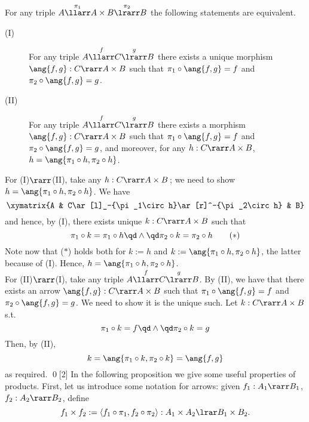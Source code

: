 \documentclass[12pt]{article}
\begin{document}
\begin{myproposition}\label{p:prod}
For any triple $A\overset{\pi_1}{\llarr}A\times B\overset{\pi_2}{\lrarr}B$ the following statements are equivalent.
\begin{description}
\item[(I)] For any triple $A\overset{f}{\llarr}C\overset{g}{\lrarr}B$ there exists a {unique} morphism $\ang{f,g}:C\rarr A\times B$
                        such that $\pi_1\circ\ang{f,g}=f$ and $\pi_2\circ\ang{f,g}=g$.
\item[(II)]For any triple $A\overset{f}{\llarr}C\overset{g}{\lrarr}B$ there exists a morphism $\ang{f,g}:C\rarr A\times B$
                        such that $\pi_1\circ\ang{f,g}=f$ and $\pi_2\circ\ang{f,g}=g$, and
                        moreover, for any $h:C\rarr A\times B$, $h=\ang{\pi_1\circ h,\pi_2\circ h}$.
\end{description}
\end{myproposition}
\proof
%
For (I)$\rarr$(II), take any $h:C\rarr A\times B$\,; we need to show $h=\ang{\pi_1\circ h,\pi_2\circ h}$. We have
\[ \xymatrix{A & C\ar[l]_-{\pi_1\circ h}\ar[r]^-{\pi_2\circ h} & B} \]
and hence, by (I), there exists unique $k:C\rarr A\times B$ such that
\[ \pi_1\circ k= \pi_1\circ h \qd\land\qd \pi_2\circ k= \pi_2\circ h \tag{$*$}\]
Note now that ($*$) holds both for $k:=h$ and $k:=\ang{\pi_1\circ h,\pi_2\circ h}$, the latter because of (I). Hence, $h=\ang{\pi_1\circ h,\pi_2\circ
h}$.
\\
For (II)$\rarr$(I), take any triple $A\overset{f}{\llarr}C\overset{g}{\lrarr}B$. By (II), we have that there exists an arrow $\ang{f,g}:C\rarr
A\times B$ such that $\pi_1\circ\ang{f,g}=f$ and $\pi_2\circ\ang{f,g}=g$. We need to show it is the unique such. Let $k:C\rarr A\times B$ s.t.
\[ \pi_1\circ k= f \qd\land\qd \pi_2\circ k= g \]
Then, by (II),
\[ k=\ang{\pi_1\circ k,\pi_2\circ k}=\ang{f,g} \]
as required. \qed[2]
%
In the following proposition we give some useful properties of products. First, let us introduce some notation for arrows: given $f_{1} : A_{1} \rarr
B_{1}$, $f_{2} : A_{2} \rarr B_{2}$, define
\[ f_{1} \times f_{2}  := \langle f_{1} \circ \pi_{1},  f_{2} \circ \pi_{2} \rangle : A_{1} \times A_{2} \lrar B_{1} \times B_{2}. \]
\end{document}
